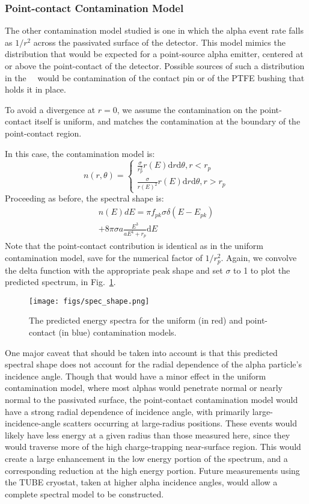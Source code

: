 \documentclass[groupedaddress,rmp,amsmath,amssymb,bibnotes,altaffilletter,twocolumn]{revtex4-1}
\begin{document}
\subsubsection{Point-contact Contamination Model}
The other contamination model studied is one in which the alpha event rate falls as $1/r^2$ across the passivated surface of the detector. This model mimics the distribution that would be expected for a point-source alpha emitter, centered at or above the point-contact of the detector. Possible sources of such a distribution in the \MJ\ \DEM\ would be contamination of the contact pin or of the PTFE bushing that holds it in place. 

To avoid a divergence at $r=0$, we assume the contamination on the point-contact itself is uniform, and matches the contamination at the boundary of the point-contact region. 

In this case, the contamination model is:
$$n(r, \theta)=
\begin{cases}
\frac{\sigma}{r_p^2} r(E) \mathrm{d}r \mathrm{d}\theta, r<r_p \\
\frac{\sigma}{r(E)^2} r(E) \mathrm{d}r \mathrm{d}\theta, r>r_p
\end{cases}
$$
Proceeding as before, the spectral shape is:
\begin{equation}
\begin{split}
n(E)dE = \pi f_{pk}\sigma\delta(E-E_{pk}) \\
+ 8\pi \sigma a \frac{E^3}{aE^4+r_p} \mathrm{d}E
\end{split}
\end{equation}
Note that the point-contact contribution is identical as in the uniform contamination model, save for the numerical factor of $1/r_p^2$. Again, we convolve the delta function with the appropriate peak shape and set $\sigma$ to 1 to plot the predicted spectrum, in Fig.~\ref{fig:spec_shape}. 

\begin{figure}[]
 \centering
 \texttt{[image: figs/spec\_shape.png]}
 \caption{The predicted energy spectra for the uniform (in red) and point-contact (in blue) contamination models.} 
 \label{fig:spec_shape}
\end{figure}

One major caveat that should be taken into account is that this predicted spectral shape does not account for the radial dependence of the alpha particle's incidence angle. Though that would have a minor effect in the uniform contamination model, where most alphas would penetrate normal or nearly normal to the passivated surface, the point-contact contamination model would have a strong radial dependence of incidence angle, with primarily large-incidence-angle scatters occurring at large-radius positions. These events would likely have less energy at a given radius than those measured here, since they would traverse more of the high charge-trapping near-surface region. This would create a large enhancement in the low energy portion of the spectrum, and a corresponding reduction at the high energy portion. Future measurements using the TUBE cryostat, taken at higher alpha incidence angles, would allow a complete spectral model to be constructed.
\end{document}
